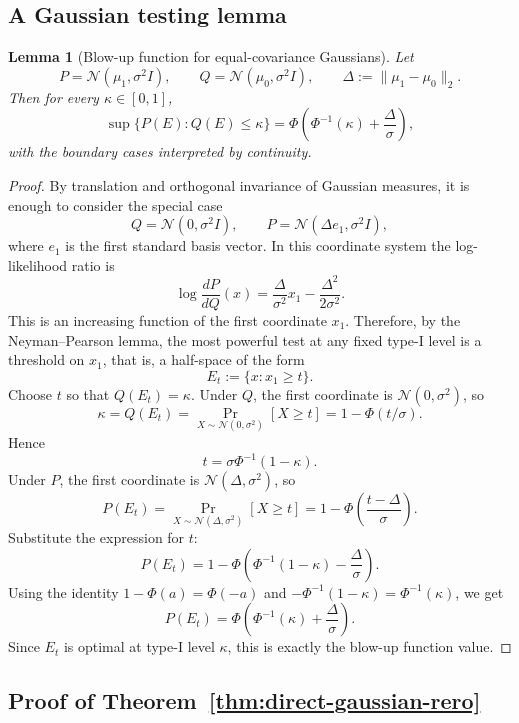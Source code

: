 \documentclass[conference,compsoc]{IEEEtran}
\newtheorem{lemma}{Lemma}
\begin{document}
\subsection{A Gaussian testing lemma}

\begin{lemma}[Blow-up function for equal-covariance Gaussians]
\label{lem:gaussian-blowup}
Let
\[
P=\mathcal{N}(\mu_1,\sigma^2 I),
\qquad
Q=\mathcal{N}(\mu_0,\sigma^2 I),
\qquad
\Delta:=\|\mu_1-\mu_0\|_2.
\]
Then for every $\kappa\in[0,1]$,
\[
\sup\{P(E): Q(E)\le \kappa\}
=
\Phi\!\left(\Phi^{-1}(\kappa)+\frac{\Delta}{\sigma}\right),
\]
with the boundary cases interpreted by continuity.
\end{lemma}

\begin{proof}
By translation and orthogonal invariance of Gaussian measures, it is enough to consider the special case
\[
Q=\mathcal{N}(0,\sigma^2 I),
\qquad
P=\mathcal{N}(\Delta e_1,\sigma^2 I),
\]
where $e_1$ is the first standard basis vector. In this coordinate system the log-likelihood ratio is
\[
\log\frac{dP}{dQ}(x)
=
\frac{\Delta}{\sigma^2}x_1-\frac{\Delta^2}{2\sigma^2}.
\]
This is an increasing function of the first coordinate $x_1$. Therefore, by the Neyman--Pearson lemma, the most powerful test at any fixed type-I level is a threshold on $x_1$, that is, a half-space of the form
\[
E_t:=\{x: x_1\ge t\}.
\]
Choose $t$ so that $Q(E_t)=\kappa$. Under $Q$, the first coordinate is $\mathcal{N}(0,\sigma^2)$, so
\[
\kappa=Q(E_t)=\Pr_{X\sim\mathcal{N}(0,\sigma^2)}[X\ge t]
=1-\Phi(t/\sigma).
\]
Hence
\[
t=\sigma\Phi^{-1}(1-\kappa).
\]
Under $P$, the first coordinate is $\mathcal{N}(\Delta,\sigma^2)$, so
\[
P(E_t)
=
\Pr_{X\sim\mathcal{N}(\Delta,\sigma^2)}[X\ge t]
=
1-\Phi\!\left(\frac{t-\Delta}{\sigma}\right).
\]
Substitute the expression for $t$:
\[
P(E_t)
=
1-\Phi\!\left(\Phi^{-1}(1-\kappa)-\frac{\Delta}{\sigma}\right).
\]
Using the identity $1-\Phi(a)=\Phi(-a)$ and $-\Phi^{-1}(1-\kappa)=\Phi^{-1}(\kappa)$, we get
\[
P(E_t)
=
\Phi\!\left(\Phi^{-1}(\kappa)+\frac{\Delta}{\sigma}\right).
\]
Since $E_t$ is optimal at type-I level $\kappa$, this is exactly the blow-up function value.
\end{proof}

\subsection{Proof of Theorem~\ref{thm:direct-gaussian-rero}}
\end{document}
